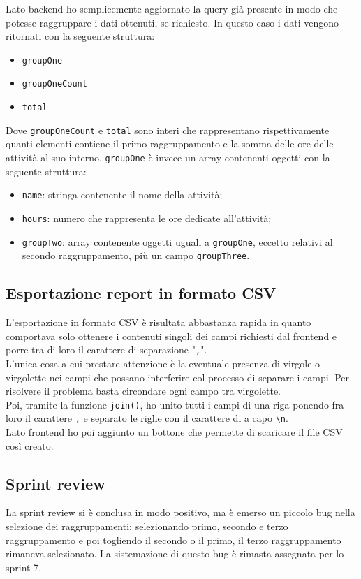 Lato backend ho semplicemente aggiornato la query già presente in modo che potesse raggruppare i dati ottenuti, se richiesto. In questo caso i dati vengono ritornati con la seguente struttura:
\begin{itemize}
  \item \texttt{groupOne}
  \item \texttt{groupOneCount}
  \item \texttt{total}
\end{itemize}
Dove \texttt{groupOneCount} e \texttt{total} sono interi che rappresentano rispettivamente quanti elementi contiene il primo raggruppamento e la somma delle ore delle attività al suo interno.
\texttt{groupOne} è invece un array contenenti oggetti con la seguente struttura:
\begin{itemize}
  \item \texttt{name}: stringa contenente il nome della attività;
  \item \texttt{hours}: numero che rappresenta le ore dedicate all'attività;
  \item \texttt{groupTwo}: array contenente oggetti uguali a \texttt{groupOne}, eccetto relativi al secondo raggruppamento, più un campo \texttt{groupThree}.
\end{itemize}

\subsection{Esportazione report in formato CSV}
L'esportazione in formato CSV è risultata abbastanza rapida in quanto comportava solo ottenere i contenuti singoli dei campi richiesti dal frontend e porre tra di loro il carattere di separazione "\texttt{,}".\\
L'unica cosa a cui prestare attenzione è la eventuale presenza di virgole o virgolette nei campi che possano interferire col processo di separare i campi.
Per risolvere il problema basta circondare ogni campo tra virgolette.\\
Poi, tramite la funzione \texttt{join()}, ho unito tutti i campi di una riga ponendo fra loro il carattere \texttt{,} e separato le righe con il carattere di a capo \texttt{\textbackslash n}.\\
Lato frontend ho poi aggiunto un bottone che permette di scaricare il file CSV così creato.

\subsection{Sprint review}
La sprint review si è conclusa in modo positivo, ma è emerso un piccolo bug nella selezione dei raggruppamenti: selezionando primo, secondo e terzo raggruppamento e poi togliendo il secondo o il primo, il terzo raggruppamento rimaneva selezionato. La sistemazione di questo bug è rimasta assegnata per lo sprint 7.